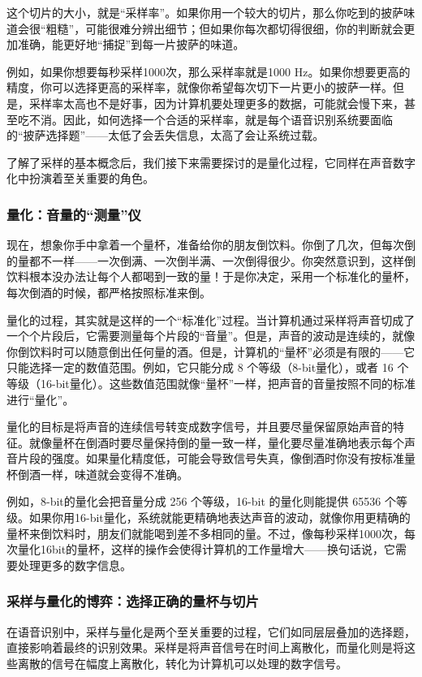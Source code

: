 这个切片的大小，就是“采样率”。如果你用一个较大的切片，那么你吃到的披萨味道会很“粗糙”，可能很难分辨出细节；但如果你每次都切得很细，你的判断就会更加准确，能更好地“捕捉”到每一片披萨的味道。

例如，如果你想要每秒采样1000次，那么采样率就是1000 Hz。如果你想要更高的精度，你可以选择更高的采样率，就像你希望每次切下一片更小的披萨一样。但是，采样率太高也不是好事，因为计算机要处理更多的数据，可能就会慢下来，甚至吃不消。因此，如何选择一个合适的采样率，就是每个语音识别系统要面临的“披萨选择题”——太低了会丢失信息，太高了会让系统过载。

了解了采样的基本概念后，我们接下来需要探讨的是量化过程，它同样在声音数字化中扮演着至关重要的角色。

\subsubsection{量化：音量的“测量”仪}

现在，想象你手中拿着一个量杯，准备给你的朋友倒饮料。你倒了几次，但每次倒的量都不一样——一次倒满、一次倒半满、一次倒得很少。你突然意识到，这样倒饮料根本没办法让每个人都喝到一致的量！于是你决定，采用一个标准化的量杯，每次倒酒的时候，都严格按照标准来倒。

量化的过程，其实就是这样的一个“标准化”过程。当计算机通过采样将声音切成了一个个片段后，它需要测量每个片段的“音量”。但是，声音的波动是连续的，就像你倒饮料时可以随意倒出任何量的酒。但是，计算机的“量杯”必须是有限的——它只能选择一定的数值范围。例如，它只能分成 8 个等级（8-bit量化），或者 16 个等级（16-bit量化）。这些数值范围就像“量杯”一样，把声音的音量按照不同的标准进行“量化”。

量化的目标是将声音的连续信号转变成数字信号，并且要尽量保留原始声音的特征。就像量杯在倒酒时要尽量保持倒的量一致一样，量化要尽量准确地表示每个声音片段的强度。如果量化精度低，可能会导致信号失真，像倒酒时你没有按标准量杯倒酒一样，味道就会变得不准确。

例如，8-bit的量化会把音量分成 256 个等级，16-bit 的量化则能提供 65536 个等级。如果你用16-bit量化，系统就能更精确地表达声音的波动，就像你用更精确的量杯来倒饮料时，朋友们就能喝到差不多相同的量。不过，像每秒采样1000次，每次量化16bit的量杯，这样的操作会使得计算机的工作量增大——换句话说，它需要处理更多的数字信息。

\subsubsection{采样与量化的博弈：选择正确的量杯与切片}

在语音识别中，采样与量化是两个至关重要的过程，它们如同层层叠加的选择题，直接影响着最终的识别效果。采样是将声音信号在时间上离散化，而量化则是将这些离散的信号在幅度上离散化，转化为计算机可以处理的数字信号。

